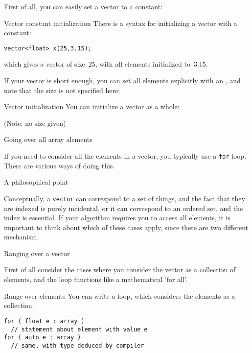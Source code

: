 First of all, you can easily set a vector to a constant:

\begin{block}{Vector constant initialization}
  \label{sl:vector-initconst}
  There is a syntax for initializing a vector with a constant:
\begin{lstlisting}
vector<float> x(25,3.15);
\end{lstlisting}
which gives a vector of size~25, with all elements initialized to~3.15.
\end{block}

If your vector is short enough, you can set all elements explicitly with an
, and note that the size is not specified here:


\begin{slide}{Vector initialization}
  \label{sl:vector-init}
  You can initialize a vector as a whole:

  (Note: no size given)
\end{slide}

 {Going over all array alements}
\label{sec:arrayrange}

If you need to consider all the elements in a vector, you typically
use a \lstinline{for} loop. There are various ways of doing this.

\begin{block}{A philosophical point}
  \label{sl:vector-access-types}

  Conceptually, a \lstinline{vector} can correspond to a set of things,
  and the fact that they are indexed is purely incidental,
  or it can correspond to an ordered set,
  and the index is essential.
  If your algorithm requires you to access all elements,
  it is important to think about which of these cases apply,
  since there are two different mechanism.
\end{block}

 {Ranging over a vector}

First of all consider the cases where you consider the vector as a
collection of elements, and the loop functions like a mathematical
`for all'.

\begin{block}{Range over elements}
  \label{sl:array-range}
  You can write a  loop, which
  considers the elements as a collection.
\begin{lstlisting}
for ( float e : array )
  // statement about element with value e
for ( auto e : array )
  // same, with type deduced by compiler
\end{lstlisting}

\end{block}

